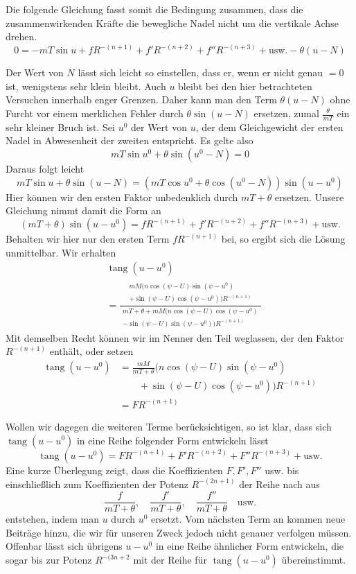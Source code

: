 Die folgende Gleichung fasst somit die Bedingung zusammen, dass die zusammenwirkenden Kräfte die bewegliche Nadel nicht um die vertikale Achse drehen.
\[
0=-mT\sin u+fR^{-(n+1)}+f'R^{-(n+2)}+f''R^{-(n+3)}+\text{usw.}-\theta(u-N)
\]

Der Wert von $N$ lässt sich leicht so einstellen, dass er, wenn er nicht genau $=0$ ist, wenigstens sehr klein bleibt. Auch $u$ bleibt bei den hier betrachteten Versuchen innerhalb enger Grenzen. Daher kann man den Term $\theta(u-N)$ ohne Furcht vor einem merklichen Fehler durch $\theta\sin(u-N)$ ersetzen, zumal $\frac{\theta}{mT}$ ein sehr kleiner Bruch ist. Sei $u^0$ der Wert von $u$, der dem Gleichgewicht der ersten Nadel in Abwesenheit der zweiten entspricht. Es gelte also
\[
mT\sin u^0+\theta\sin(u^0-N)=0
\]
Daraus folgt leicht
\[
mT\sin u+\theta\sin(u-N)=(mT\cos u^0+\theta\cos(u^0-N))\sin(u-u^0)
\]
Hier können wir den ersten Faktor unbedenklich durch $mT+\theta$ ersetzen. Unsere Gleichung nimmt damit die Form an
\[
(mT+\theta)\sin(u-u^0)=fR^{-(n+1)}+f'R^{-(n+2)}+f''R^{-(n+3)}+\text{usw.}
\]
Behalten wir hier nur den ersten Term $fR^{-(n+1)}$ bei, so ergibt sich die Lösung unmittelbar. Wir erhalten
\[
\begin{aligned}
&\operatorname{tang}(u-u^0)\\
&=\frac{\begin{gathered}mM(n\cos(\psi-U)\sin(\psi-u^0)\\+\sin(\psi-U)\cos(\psi-u^0))R^{-(n+1)}\end{gathered}}{\begin{gathered}mT+\theta+mM(n\cos(\psi-U)\cos(\psi-u^0)\\-\sin(\psi-U)\sin(\psi-u^0))R^{-(n+1)}\end{gathered}}
\end{aligned}
\]
Mit demselben Recht können wir im Nenner den Teil weglassen, der den Faktor $R^{-(n+1)}$ enthält, oder setzen
\[
\begin{aligned}
\operatorname{tang}(u-u^0)&=\frac{mM}{mT+\theta}(n\cos(\psi-U)\sin(\psi-u^0)\\
&\qquad+\sin(\psi-U)\cos(\psi-u^0))R^{-(n+1)}\\
&=FR^{-(n+1)}
\end{aligned}
\]

Wollen wir dagegen die weiteren Terme berücksichtigen, so ist klar, dass sich $\operatorname{tang}(u-u^0)$ in eine Reihe folgender Form entwickeln lässt
\[
\operatorname{tang}(u-u^0)=FR^{-(n+1)}+F'R^{-(n+2)}+F''R^{-(n+3)}+\text{usw.}
\]
Eine kurze Überlegung zeigt, dass die Koeffizienten $F,F',F''$ usw. bis einschließlich zum Koeffizienten der Potenz $R^{-(2n+1)}$ der Reihe nach aus
\[
\frac{f}{mT+\theta},\quad\frac{f'}{mT+\theta},\quad\frac{f''}{mT+\theta}\quad\text{usw.}
\]
entstehen, indem man $u$ durch $u^0$ ersetzt. Vom nächsten Term an kommen neue Beiträge hinzu, die wir für unseren Zweck jedoch nicht genauer verfolgen müssen. Offenbar lässt sich übrigens $u-u^0$ in eine Reihe ähnlicher Form entwickeln, die sogar bis zur Potenz $R^{-(3n+2}$ mit der Reihe für $\operatorname{tang}(u-u^0)$ übereinstimmt.

